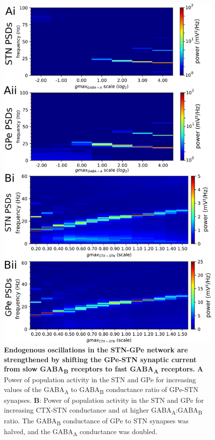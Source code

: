 %
\begin{figure}
\centering
\includegraphics[height=\dimexpr \textheight - 9\baselineskip\relax]{ch_detailed_model/figs_split/fig_endogenous_sweep-gaba-AB_AC-psd-all.png}
\caption{
\textbf{Endogenous oscillations in the STN-GPe network are strengthened by shifting the GPe-STN synaptic current from slow GABA\textsubscript{B} receptors to fast GABA\textsubscript{A} receptors.}
\textbf{A} Power of population activity in the STN and GPe for increasing values of the GABA\textsubscript{A} to GABA\textsubscript{B} conductance ratio of GPe-STN synapses.
\textbf{B}: Power of population activity in the STN and GPe for increasing CTX-STN conductance and at higher GABA\textsubscript{A}:GABA\textsubscript{B} ratio. The GABA\textsubscript{B} conductance of GPe to STN synapses was halved, and the GABA\textsubscript{A} conductance was doubled.
}
\label{fig:endogenous_sweep-gaba-AB-gpe-stn_AC-psd-all}
\end{figure}

